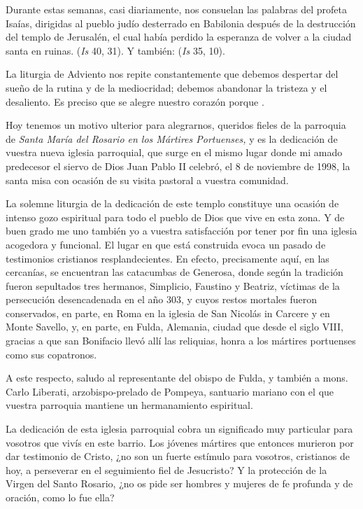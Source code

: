 Durante estas semanas, casi diariamente, nos consuelan las palabras del profeta Isaías, dirigidas al pueblo judío desterrado en Babilonia después de la destrucción del templo de Jerusalén, el cual había perdido la esperanza de volver a la ciudad santa en ruinas.  (\emph{Is} 40, 31). Y también:  (\emph{Is} 35, 10).

La liturgia de Adviento nos repite constantemente que debemos despertar del sueño de la rutina y de la mediocridad; debemos abandonar la tristeza y el desaliento. Es preciso que se alegre nuestro corazón porque .

Hoy tenemos un motivo ulterior para alegrarnos, queridos fieles de la parroquia de \emph{Santa María del Rosario en los Mártires Portuenses,} y es la dedicación de vuestra nueva iglesia parroquial, que surge en el mismo lugar donde mi amado predecesor el siervo de Dios Juan Pablo II celebró, el 8 de noviembre de 1998, la santa misa con ocasión de su visita pastoral a vuestra comunidad.

La solemne liturgia de la dedicación de este templo constituye una ocasión de intenso gozo espiritual para todo el pueblo de Dios que vive en esta zona. Y de buen grado me uno también yo a vuestra satisfacción por tener por fin una iglesia acogedora y funcional. El lugar en que está construida evoca un pasado de testimonios cristianos resplandecientes. En efecto, precisamente aquí, en las cercanías, se encuentran las catacumbas de Generosa, donde según la tradición fueron sepultados tres hermanos, Simplicio, Faustino y Beatriz, víctimas de la persecución desencadenada en el año 303, y cuyos restos mortales fueron conservados, en parte, en Roma en la iglesia de San Nicolás in Carcere y en Monte Savello, y, en parte, en Fulda, Alemania, ciudad que desde el siglo VIII, gracias a que san Bonifacio llevó allí las reliquias, honra a los mártires portuenses como sus copatronos.

A este respecto, saludo al representante del obispo de Fulda, y también a mons. Carlo Liberati, arzobispo-prelado de Pompeya, santuario mariano con el que vuestra parroquia mantiene un hermanamiento espiritual.

La dedicación de esta iglesia parroquial cobra un significado muy particular para vosotros que vivís en este barrio. Los jóvenes mártires que entonces murieron por dar testimonio de Cristo, ¿no son un fuerte estímulo para vosotros, cristianos de hoy, a perseverar en el seguimiento fiel de Jesucristo? Y la protección de la Virgen del Santo Rosario, ¿no os pide ser hombres y mujeres de fe profunda y de oración, como lo fue ella?

